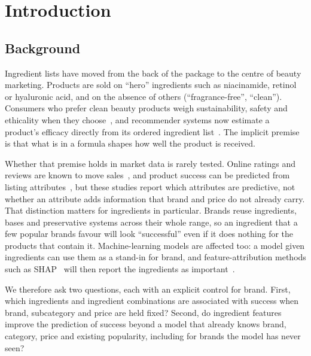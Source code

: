 \documentclass[11pt,a4paper]{article}
\begin{document}
\section{Introduction}

\subsection{Background}
Ingredient lists have moved from the back of the package to the centre of beauty marketing. Products are sold on ``hero'' ingredients such as niacinamide, retinol or hyaluronic acid, and on the absence of others (``fragrance-free'', ``clean''). Consumers who prefer clean beauty products weigh sustainability, safety and ethicality when they choose~\cite{shim2024}, and recommender systems now estimate a product's efficacy directly from its ordered ingredient list~\cite{lee2024}. The implicit premise is that what is in a formula shapes how well the product is received.

Whether that premise holds in market data is rarely tested. Online ratings and reviews are known to move sales~\cite{chevalier2006,babic2016,moen2017}, and product success can be predicted from listing attributes~\cite{aulya2025,sari2026}, but these studies report which attributes are predictive, not whether an attribute adds information that brand and price do not already carry. That distinction matters for ingredients in particular. Brands reuse ingredients, bases and preservative systems across their whole range, so an ingredient that a few popular brands favour will look ``successful'' even if it does nothing for the products that contain it. Machine-learning models are affected too: a model given ingredients can use them as a stand-in for brand, and feature-attribution methods such as SHAP~\cite{lundberg2017shap} will then report the ingredients as important~\cite{kumar2020,molnar2022}.

We therefore ask two questions, each with an explicit control for brand. First, which ingredients and ingredient combinations are associated with success when brand, subcategory and price are held fixed? Second, do ingredient features improve the prediction of success beyond a model that already knows brand, category, price and existing popularity, including for brands the model has never seen?
\end{document}
